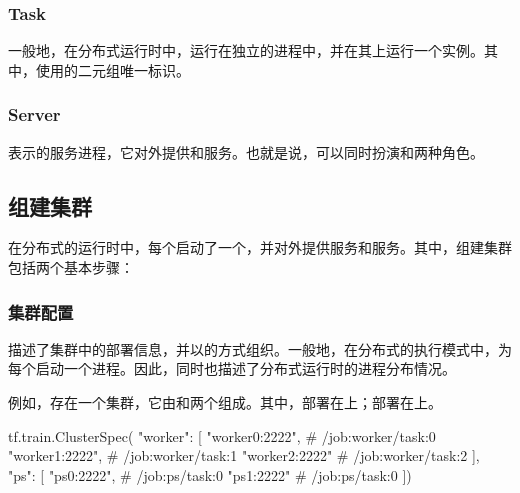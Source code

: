 \begin{content}
\subsubsection{Task}

一般地，在分布式运行时中，运行在独立的进程中，并在其上运行一个实例。其中，使用的二元组唯一标识。

\subsubsection{Server}

表示的服务进程，它对外提供和服务。也就是说，可以同时扮演和两种角色。

\subsection{组建集群}

在分布式的\tf{}运行时中，每个启动了一个，并对外提供服务和服务。其中，组建集群包括两个基本步骤：

\begin{enum}
\end{enum}

\subsubsection{集群配置}

描述了集群中的部署信息，并以的方式组织。一般地，在分布式的执行模式中，为每个启动一个进程。因此，同时也描述了分布式运行时的进程分布情况。

例如，存在一个集群，它由和两个组成。其中，部署在上；部署在上。

\begin{leftbar}
\begin{python}
tf.train.ClusterSpec({
  "worker": [
    "worker0:2222",   # /job:worker/task:0
    "worker1:2222",   # /job:worker/task:1
    "worker2:2222"    # /job:worker/task:2
  ],  
  "ps": [
    "ps0:2222",       # /job:ps/task:0
    "ps1:2222"        # /job:ps/task:0
  ]})
\end{python}
\end{leftbar}


\end{content}
